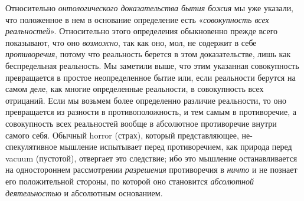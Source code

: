 Относительно {\em онтологического доказательства бытия
божия} мы уже указали, что положенное в нем в основание определение есть
«{\em совокупность всех реальностей}». Относительно
этого определения обыкновенно прежде всего показывают, что оно
{\em возможно}, так как оно, мол, не содержит в себе
{\em противоречия}, потому что реальность берется в
этом доказательстве, лишь как беспредельная реальность. Мы заметили выше,
что этим указанная совокупность превращается в простое неопределенное бытие
или, если реальности берутся на самом деле, как многие определенные
реальности, в совокупность всех отрицаний. Если мы возьмем более
определенно различие реальности, то оно превращается из разности в
противоположность, и тем самым в противоречие, а совокупность всех
реальностей вообще в абсолютное противоречие внутри самого себя. Обычный
horror (страх), который представляющее, не-спекулятивное мышление
испытывает перед противоречием, как природа перед vacuum (пустотой),
отвергает это следствие; ибо это мышление останавливается на одностороннем
рассмотрении {\em разрешения} противоречия в
{\em ничто} и не познает его положительной стороны, по
которой оно становится {\em абсолютной деятельностью} и
абсолютным основанием.


